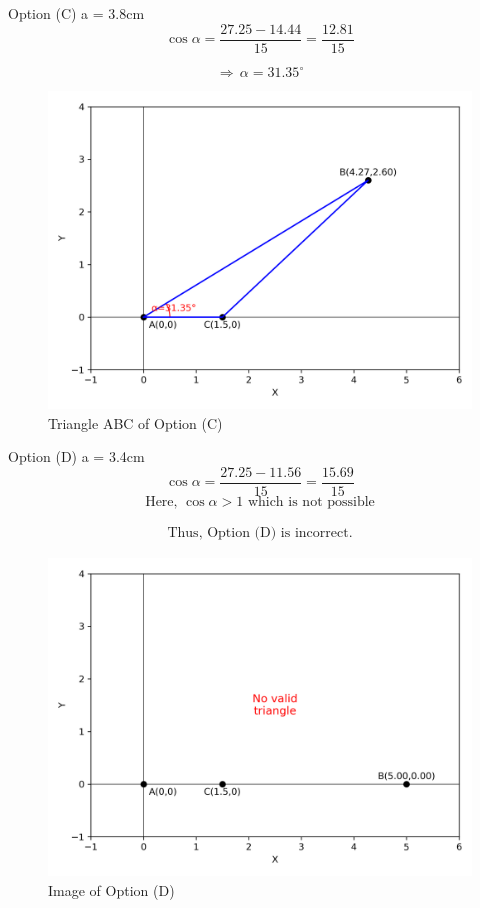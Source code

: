 \documentclass[journal]{IEEEtran}
\begin{document}
\newpage

Option (C) a = 3.8cm
\begin{equation}
    \cos\alpha = \dfrac{27.25 - 14.44}{15} = \dfrac{12.81}{15}
\end{equation}

 \begin{equation}
\Rightarrow \, \alpha = 31.35^\circ     
 \end{equation}

\begin{figure}[htbp]
    \centering
    \includegraphics[width=\columnwidth]{figs/fig3.png}
    \caption{Triangle ABC of Option (C)}
    \label{fig:placeholder}
\end{figure}

\newpage

Option (D) a = 3.4cm
\begin{equation}
    \cos\alpha = \dfrac{27.25 - 11.56}{15} = \dfrac{15.69}{15}
\end{equation}
\begin{equation}
    \text{Here, } \cos\alpha > 1 \text{ which is not possible}
\end{equation}

\begin{align*}
    \boxed{\text{Thus, Option (D) is incorrect.}}
\end{align*}

\begin{figure}[htbp]
    \centering
    \includegraphics[width=\columnwidth]{figs/fig4.png}
    \caption{Image of Option (D)}
    \label{fig:placeholder}
\end{figure}
\end{document}
